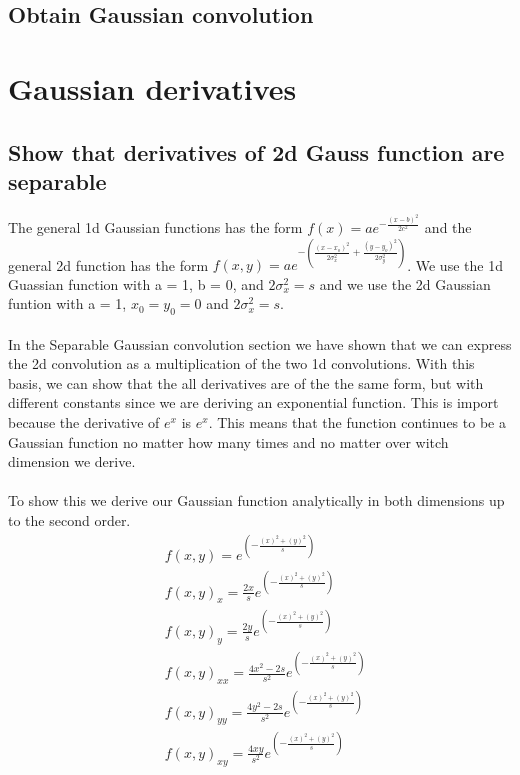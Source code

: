 \documentclass[abstract=true]{scrartcl}
\begin{document}
    \subsection{Obtain Gaussian convolution}


\section{Gaussian derivatives}

    \subsection{Show that derivatives of 2d Gauss function are separable}
    
    The general 1d Gaussian functions has the form 
    $ f(x) = a e^{- { \frac{(x-b)^2 }{ 2 c^2} } } $ 
    and the general 2d function has the form 
    $ f(x,y) = a e^{- \left(\frac{(x-x_o)^2}{2\sigma_x^2} + \frac{(y-y_o)^2}{2\sigma_y^2} \right)} $. 
    We use the 1d Guassian function with a = 1, b = 0, and $ 2\sigma_x^2 = s $ and
    we use the 2d Gaussian funtion with a = 1, $ x_0 = y_0 = 0 $ and $ 2\sigma_x^2 = s $.\\
    \\
    In the Separable Gaussian convolution section we have shown that we can express the
    2d convolution as a multiplication of the two 1d convolutions. With this 
    basis, we can show that the all derivatives are of the the 
    same form, but with different constants since we are deriving an exponential
    function. This is import because the derivative of $e^x$ is $e^x$. This 
    means that the function continues to be a Gaussian function no matter how
    many times and no matter over witch dimension we derive. \\
    \\
    To show this we derive our Gaussian function analytically in both dimensions 
    up to the second order.\\
    \begin{align*}
    &f(x,y)   =  e^{ (-\frac{(x)^2 +(y)^2}{s})} \\
    &f(x,y)_x =  \frac{2x}{s} e^{ (-\frac{(x)^2 +(y)^2}{s})} \\
    &f(x,y)_y = \frac{2y}{s} e^{ ( -\frac{(x)^2 +(y)^2}{s})} \\
    &f(x,y)_{xx} =  \frac{4x^2-2s}{s^2} e^{ (-\frac{(x)^2 +(y)^2}{s})} \\
    &f(x,y)_{yy} =  \frac{4y^2-2s}{s^2} e^{ (-\frac{(x)^2 +(y)^2}{s})} \\
    &f(x,y)_{xy} =  \frac{4xy}{s^2} e^{ (-\frac{(x)^2 +(y)^2}{s})}
    \end{align*}
    
\end{document}
